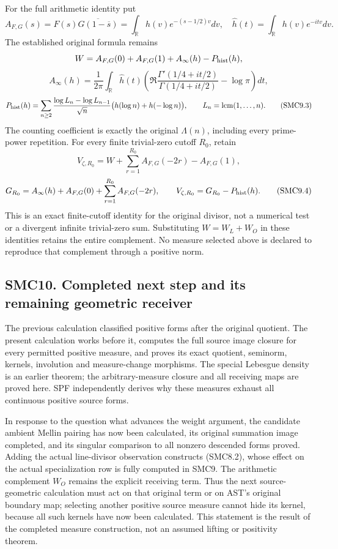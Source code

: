 For the full arithmetic identity put \[
A_{F,G}(s)=F(s)\overline{G(1-\overline s)}
=\int_{\mathbb R}h(v)e^{-(s-1/2)v}dv,
\quad\widehat h(t)=\int_{\mathbb R}h(v)e^{-itv}dv.
\] The established original formula remains \[
W=A_{F,G}(0)+A_{F,G}(1)+A_\infty(h)-P_{\rm hist}(h),
\] \[
A_\infty(h)=\frac1{2\pi}\int_{\mathbb R}\widehat h(t)
\left(\Re\frac{\Gamma'(1/4+it/2)}{\Gamma(1/4+it/2)}-\log\pi\right)dt,
\] \[
P_{\rm hist}(h)=\sum_{n\ge2}\frac{\log L_n-\log L_{n-1}}{\sqrt n}
\bigl(h(\log n)+h(-\log n)\bigr),\qquad L_n=\operatorname{lcm}(1,\ldots,n).
\tag{SMC9.3}
\] The counting coefficient is exactly the original \(\Lambda(n)\),
including every prime-power repetition. For every finite trivial-zero
cutoff \(R_0\), retain \[
V_{\zeta,R_0}=W+\sum_{r=1}^{R_0}A_{F,G}(-2r)-A_{F,G}(1),
\] \[
G_{R_0}=A_\infty(h)+A_{F,G}(0)+\sum_{r=1}^{R_0}A_{F,G}(-2r),
\qquad V_{\zeta,R_0}=G_{R_0}-P_{\rm hist}(h).
\tag{SMC9.4}
\] This is an exact finite-cutoff identity for the original divisor, not
a numerical test or a divergent infinite trivial-zero sum. Substituting
\(W=W_L+W_O\) in these identities retains the entire complement. No
measure selected above is declared to reproduce that complement through
a positive norm.

\subsection{SMC10. Completed next step and its remaining geometric
receiver}\label{smc10.-completed-next-step-and-its-remaining-geometric-receiver}

The previous calculation classified positive forms after the original
quotient. The present calculation works before it, computes the full
source image closure for every permitted positive measure, and proves
its exact quotient, seminorm, kernels, involution and measure-change
morphisms. The special Lebesgue density is an earlier theorem; the
arbitrary-measure closure and all receiving maps are proved here. SPF
independently derives why these measures exhaust all continuous positive
source forms.

In response to the question what advances the weight argument, the
candidate ambient Mellin pairing has now been calculated, its original
summation image completed, and its singular comparison to all nonzero
descended forms proved. Adding the actual line-divisor observation
constructs (SMC8.2), whose effect on the actual specialization row is
fully computed in SMC9. The arithmetic complement \(W_O\) remains the
explicit receiving term. Thus the next source-geometric calculation must
act on that original term or on AST's original boundary map; selecting
another positive source measure cannot hide its kernel, because all such
kernels have now been calculated. This statement is the result of the
completed measure construction, not an assumed lifting or positivity
theorem.

